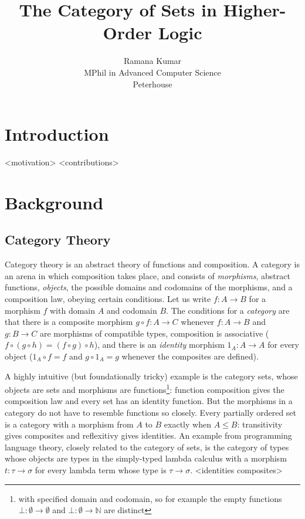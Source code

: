 \documentclass[twoside,titlepage,11pt]{article}
\title{The Category of Sets in Higher-Order Logic}
\author{Ramana Kumar\\MPhil in Advanced Computer Science\\Peterhouse}
\begin{document}
\maketitle
\section{Introduction}%
<motivation>%
<contributions>%
\section{Background}%
\subsection{Category Theory}%
Category theory is an abstract theory of functions and composition.
A category is an arena in which composition takes place, and consists of \emph{morphisms}, abstract functions, \emph{objects}, the possible domains and codomains of the morphisms, and a composition law, obeying certain conditions.
Let us write $f:A\to B$ for a morphism $f$ with domain $A$ and codomain $B$.
The conditions for a \emph{category} are that there is a composite morphism $g\circ f:A\to C$ whenever $f:A\to B$ and $g:B\to C$ are morphisms of compatible types, composition is associative ($f\circ(g\circ h)=(f\circ g)\circ h$), and there is an \emph{identity} morphism ${1_A}:A\to A$ for every object (${1_A}\circ f=f$ and $g\circ{1_A}=g$ whenever the composites are defined).%

A highly intuitive (but foundationally tricky) example is the category sets, whose objects are sets and morphisms are functions\footnote{with specified domain and codomain, so for example the empty functions $\bot:\emptyset\to\emptyset$ and $\bot:\emptyset\to\mathbb{N}$ are distinct}: function composition gives the composition law and every set has an identity function.
But the morphisms in a category do not have to resemble functions so closely.
Every partially ordered set is a category with a morphism from $A$ to $B$ exactly when $A\leq B$: transitivity gives composites and reflexitivy gives identities.
An example from programming language theory, closely related to the category of sets, is the category of types whose objects are types in the simply-typed lambda calculus with a morphism $t:\tau\to\sigma$ for every lambda term whose type is $\tau\to\sigma$. <identities composites>%
\end{document}
